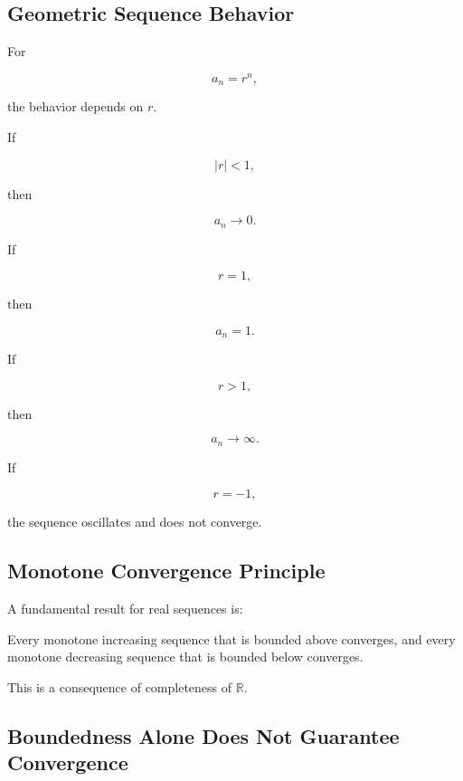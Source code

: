 \subsection{Geometric Sequence Behavior}
\label{subsec:geometric-sequence-behavior}

For

\[
a_n=r^n,
\]

the behavior depends on \(r\).

If

\[
|r|<1,
\]

then

\[
a_n\to0.
\]

If

\[
r=1,
\]

then

\[
a_n=1.
\]

If

\[
r>1,
\]

then

\[
a_n\to\infty.
\]

If

\[
r=-1,
\]

the sequence oscillates and does not converge.

\subsection{Monotone Convergence Principle}
\label{subsec:monotone-convergence-sequence}

A fundamental result for real sequences is:

\begin{importantbox}
Every monotone increasing sequence that is bounded above converges, and every
monotone decreasing sequence that is bounded below converges.
\end{importantbox}

This is a consequence of completeness of \(\mathbb{R}\).

\subsection{Boundedness Alone Does Not Guarantee Convergence}
\label{subsec:bounded-not-convergent}

